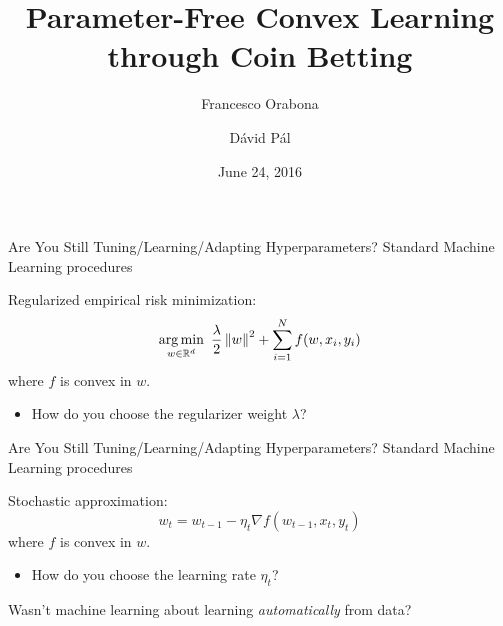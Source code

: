 \documentclass{beamer}
\title{Parameter-Free Convex Learning through Coin Betting}
\author{Francesco Orabona \and D\'avid P\'al}
\institute[] %
{
Yahoo Research, New York
}
\date[June 24, 2016]{June 24, 2016}
\newcommand{\grad}{\nabla}
\begin{document}
%
%
\begin{frame}{Are You Still Tuning/Learning/Adapting Hyperparameters?}
	Standard Machine Learning procedures
	
	\vspace{1cm}
	
	Regularized empirical risk minimization:
	\[
	\operatorname*{arg\,min}_{w \in \mathbb{R}^d} \ \frac{\lambda}{2} \left\|{w}\right\|^2 + \sum_{i=1}^N f(w, x_i, y_i)
	\]
	where $f$ is convex in $w$.
	\begin{itemize}
	\item<2> How do you choose the regularizer weight $\lambda$?
	\end{itemize}
\end{frame}
%
%
\begin{frame}{Are You Still Tuning/Learning/Adapting Hyperparameters?}
	Standard Machine Learning procedures
	
	\vspace{1cm}
	
	Stochastic approximation:
	\[
	w_t = w_{t-1} - \eta_t \grad f(w_{t-1}, x_t, y_t)
	\]
	where $f$ is convex in $w$.
	\begin{itemize}
	\item<2> How do you choose the learning rate $\eta_t$?
	\end{itemize}
\end{frame}
%
%
\begin{frame}
\center
\huge
Wasn't machine learning about learning \emph{automatically} from data?
\end{frame}
%
%
\end{document}
